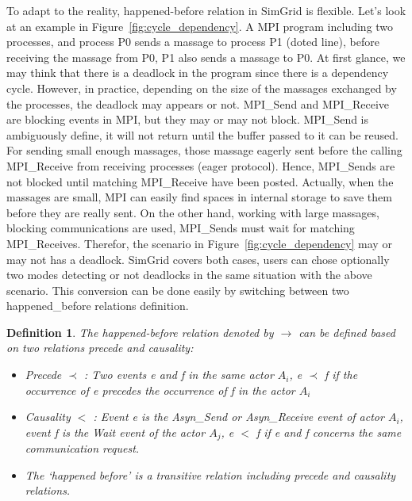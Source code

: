 \documentclass[a4paper,11pt]{article}
\newtheorem{definition}{Definition}
\begin{document}
 To adapt to the reality, happened-before relation in SimGrid is flexible. Let's look at an example in Figure~\ref{fig:cycle_dependency}. A MPI program including two processes, and process P0 sends a massage to process P1 (doted line), before receiving  the massage from P0, P1 also sends a massage to P0. At first glance, we may think that there is a deadlock in the program since there is a dependency cycle. However, in practice, depending on the size of the massages exchanged by the processes, the deadlock may appears or not. MPI\_Send and MPI\_Receive are blocking events in MPI, but they may or may not block. MPI\_Send is ambiguously define, it will not return until the buffer passed to it can be reused. For sending small enough massages, those massage eagerly sent before the calling MPI\_Receive from receiving processes (eager protocol). Hence, MPI\_Sends are not blocked until matching MPI\_Receive have been posted. Actually, when the massages are small, MPI can easily find spaces in internal storage to save them before they are really sent. On the other hand, working with large massages, blocking communications are used, MPI\_Sends must wait for matching MPI\_Receives. Therefor, the scenario in Figure~\ref{fig:cycle_dependency} may or may not has a deadlock. SimGrid covers both cases, users can chose optionally two modes detecting or not deadlocks in the same situation with the above scenario. This conversion can be done easily by switching between two happened\_before relations definition.    
  \begin{definition}
  	\label{def:happedBefore1}
  The happened-before relation  denoted by  $\rightarrow $ can be defined based on two relations precede and causality: \begin{itemize}
  	\item Precede $ \prec$ :  Two events e and f in the same actor $A_i$, e $ \prec$ f if the occurrence of e precedes the occurrence of f in the actor $A_i$  
  	\item Causality $<$ : Event e is the Asyn\_Send or Asyn\_Receive event of actor $A_i$, event f is the Wait event of the actor $A_j$,  e $<$ f if e and f concerns the same communication request.
  	\item The ‘happened before’ is a transitive relation including precede and causality relations. 
  \end{itemize}\end{definition} 
\end{document}
